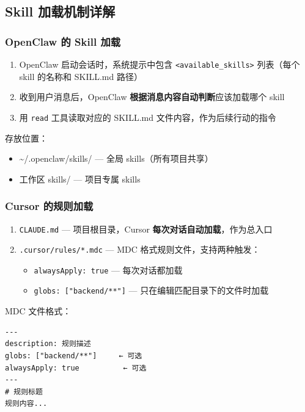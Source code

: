 \documentclass[11pt,a4paper]{article}
\begin{document}
\subsection{Skill 加载机制详解}

\subsubsection{OpenClaw 的 Skill 加载}

\begin{enumerate}[nosep]
  \item OpenClaw 启动会话时，系统提示中包含 \texttt{<available\_skills>} 列表（每个 skill 的名称和 SKILL.md 路径）
  \item 收到用户消息后，OpenClaw \textbf{根据消息内容自动判断}应该加载哪个 skill
  \item 用 \texttt{read} 工具读取对应的 SKILL.md 文件内容，作为后续行动的指令
\end{enumerate}

存放位置：
\begin{itemize}[nosep]
  \item \textasciitilde/.openclaw/skills/ --- 全局 skills（所有项目共享）
  \item 工作区 skills/ --- 项目专属 skills
\end{itemize}

\subsubsection{Cursor 的规则加载}

\begin{enumerate}[nosep]
  \item \texttt{CLAUDE.md} --- 项目根目录，Cursor \textbf{每次对话自动加载}，作为总入口
  \item \texttt{.cursor/rules/*.mdc} --- MDC 格式规则文件，支持两种触发：
  \begin{itemize}[nosep]
    \item \texttt{alwaysApply: true} --- 每次对话都加载
    \item \texttt{globs: ["backend/**"]} --- 只在编辑匹配目录下的文件时加载
  \end{itemize}
\end{enumerate}

MDC 文件格式：
\begin{verbatim}
---
description: 规则描述
globs: ["backend/**"]     ← 可选
alwaysApply: true          ← 可选
---
# 规则标题
规则内容...
\end{verbatim}
\end{document}
